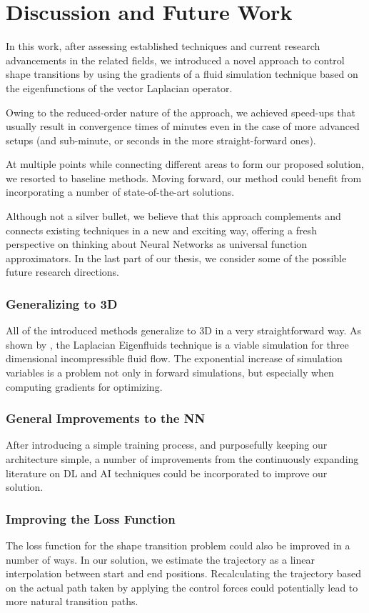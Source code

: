 \chapter{Discussion and Future Work}\label{chapter:discussion}
In this work, after assessing established techniques and current research
advancements in the related fields, we introduced a novel approach to control
shape transitions by using the gradients of a fluid simulation technique based
on the eigenfunctions of the vector Laplacian operator. 

Owing to the reduced-order nature of the approach, we achieved speed-ups that
usually result in convergence times of minutes even in the case of more advanced
setups (and sub-minute, or seconds in the more straight-forward ones).

At multiple points while connecting different areas to form our proposed
solution, we resorted to baseline methods. Moving forward, our method could
benefit from incorporating a number of state-of-the-art solutions.

Although not a silver bullet, we believe that this approach complements and
connects existing techniques in a new and exciting way, offering a fresh
perspective on thinking about Neural Networks as universal function
approximators. In the last part of our thesis, we consider some of the possible
future research directions. 

\subsection*{Generalizing to 3D}
All of the introduced methods generalize to 3D in a very straightforward way. As
shown by \citet{scalable-eigenfluids}, the Laplacian Eigenfluids technique is
a viable simulation for three dimensional incompressible fluid flow. The
exponential increase of simulation variables is a problem not only in forward
simulations, but especially when computing gradients for optimizing. 

\subsection*{General Improvements to the NN}
After introducing a simple training process, and purposefully keeping our
architecture simple, a number of improvements from the continuously expanding
literature on \ac{DL} and \ac{AI} techniques could be incorporated to improve
our solution.

\subsection*{Improving the Loss Function}
The loss function for the shape transition problem could also be improved in
a number of ways. In our solution, we estimate the trajectory as a linear
interpolation between start and end positions. Recalculating the trajectory
based on the actual path taken by applying the control forces could potentially
lead to more natural transition paths.

